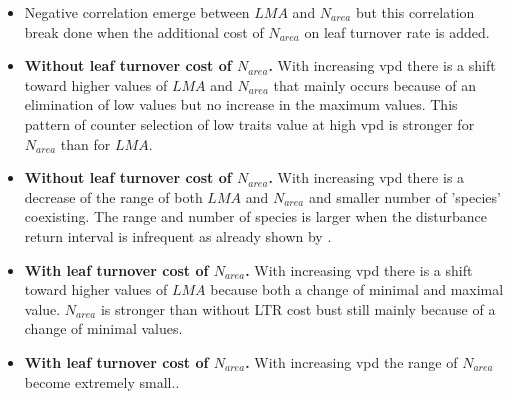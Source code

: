 \documentclass[a4paper,11pt]{article}
\begin{document}
\begin{itemize}

\item Negative correlation emerge between $LMA$ and $N_{area}$ but this correlation break done when the additional cost of $N_{area}$ on leaf turnover rate is added.

\item \textbf{Without leaf turnover cost of $N_{area}$.} With increasing vpd there is a shift toward higher values of $LMA$ and $N_{area}$ that mainly occurs because of an elimination of low values but no increase in the maximum values. This pattern of counter selection of low traits value at high vpd is stronger for $N_{area}$ than for $LMA$.

\item \textbf{Without leaf turnover cost of $N_{area}$.} With increasing vpd there is a decrease of the range of both $LMA$ and $N_{area}$ and smaller number of 'species' coexisting. The range and number of species is larger when the disturbance return interval is infrequent as already shown by \citet{Falster-2017}.

\item \textbf{With leaf turnover cost of $N_{area}$.} With increasing vpd there is a shift toward higher values of $LMA$ because both a change of minimal and maximal value. $N_{area}$ is stronger than without LTR cost bust still mainly because of a change of minimal values.

\item \textbf{With leaf turnover cost of $N_{area}$.} With increasing vpd the range of $N_{area}$ become extremely small..

\end{itemize}






\end{document}
